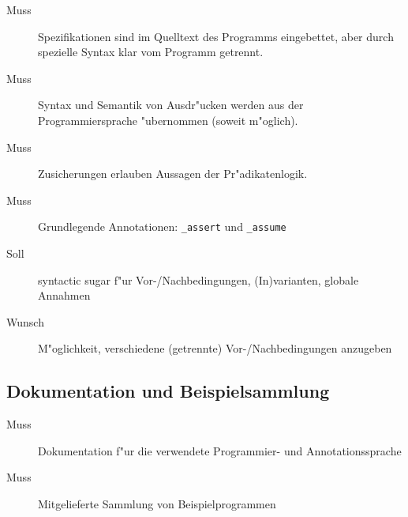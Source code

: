 \begin{description}%
    \item [Muss] Spezifikationen sind im Quelltext des Programms eingebettet, aber durch spezielle Syntax klar vom Programm getrennt.%
    \item [Muss] Syntax und Semantik von Ausdr"ucken werden aus der Programmiersprache "ubernommen (soweit m"oglich).%
    \item [Muss] Zusicherungen erlauben Aussagen der \see Pr"adikatenlogik.%
    \item [Muss] Grundlegende Annotationen: \texttt{\_assert} und \texttt{\_assume}%
    \item [Soll] syntactic sugar f"ur \see Vor-/Nachbedingungen, \see (In)varianten, \see globale Annahmen%
    \item [Wunsch] M"oglichkeit, verschiedene (getrennte) Vor-/Nachbedingungen anzugeben%
\end{description}%

\subsection{Dokumentation und Beispielsammlung}%

\begin{description}%
    \item [Muss] Dokumentation f"ur die verwendete Programmier- und Annotationssprache%
    \item [Muss] Mitgelieferte Sammlung von Beispielprogrammen%
\end{description}%
